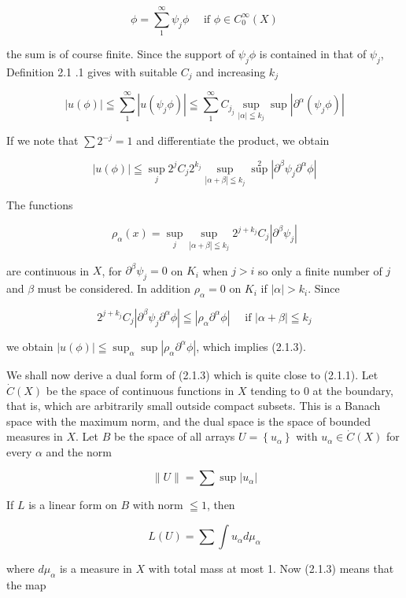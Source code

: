 \[
\phi=\sum_{1}^{\infty} \psi_{j} \phi \quad \text { if } \phi \in C_{0}^{\infty}(X)
\]

the sum is of course finite. Since the support of $\psi_{j} \phi$ is contained in that of $\psi_{j}$, Definition 2.1 .1 gives with suitable $C_{j}$ and increasing $k_{j}$

\[
|u(\phi)| \leqq \sum_{1}^{\infty}\left|u\left(\psi_{j} \phi\right)\right| \leqq \sum_{1}^{\infty} C_{j_{j}} \sup _{|\alpha| \leqq k_{j}} \sup \left|\partial^{\alpha}\left(\psi_{j} \phi\right)\right|
\]

If we note that $\sum 2^{-j}=1$ and differentiate the product, we obtain

\[
|u(\phi)| \leqq \sup _{j} 2^{j} C_{j} 2^{k_{j}} \sup _{|\alpha+\beta| \leqq k_{j}} \sup ^{2}\left|\partial^{\beta} \psi_{j} \partial^{\alpha} \phi\right|
\]

The functions

\[
\rho_{\alpha}(x)=\sup _{j} \sup _{|\alpha+\beta| \leqq k_{j}} 2^{j+k_{j}} C_{j}\left|\partial^{\beta} \psi_{j}\right|
\]

are continuous in $X$, for $\partial^{\beta} \psi_{j}=0$ on $K_{i}$ when $j>i$ so only a finite number of $j$ and $\beta$ must be considered. In addition $\rho_{\alpha}=0$ on $K_{i}$ if $|\alpha|>k_{i}$. Since

\[
2^{j+k_{j}} C_{j}\left|\partial^{\beta} \psi_{j} \partial^{\alpha} \phi\right| \leqq\left|\rho_{\alpha} \partial^{\alpha} \phi\right| \quad \text { if }|\alpha+\beta| \leqq k_{j}
\]

we obtain $|u(\phi)| \leqq \sup _{\alpha} \sup \left|\rho_{\alpha} \partial^{\alpha} \phi\right|$, which implies (2.1.3).

We shall now derive a dual form of (2.1.3) which is quite close to (2.1.1). Let $\dot{C}(X)$ be the space of continuous functions in $X$ tending to 0 at the boundary, that is, which are arbitrarily small outside compact subsets. This is a Banach space with the maximum norm, and the dual space is the space of bounded measures in $X$. Let $B$ be the space of all arrays $U=\left\{u_{\alpha}\right\}$ with $u_{\alpha} \in \dot{C}(X)$ for every $\alpha$ and the norm

\[
\|U\|=\sum \sup \left|u_{\alpha}\right|
\]

If $L$ is a linear form on $B$ with norm $\leqq 1$, then

\[
L(U)=\sum \int u_{\alpha} d \mu_{\alpha}
\]

where $d \mu_{\alpha}$ is a measure in $X$ with total mass at most 1. Now (2.1.3) means that the map

